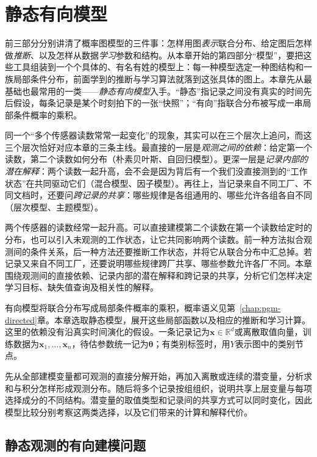 \chapter{静态有向模型}
\label{chap:pgm-static-directed}

前三部分分别讲清了概率图模型的三件事：怎样用图\emph{表示}联合分布、给定图后怎样做\emph{推断}、以及怎样从数据\emph{学习}参数和结构。从本章开始的第四部分“模型”，要把这些工具组装到一个个具体的、有名有姓的模型上：每一种模型选定一种图结构和一族局部条件分布，前面学到的推断与学习算法就落到这张具体的图上。本章先从最基础也最常用的一类——\emph{静态有向模型}入手。“静态”指记录之间没有真实的时间先后假设，每条记录是某个时刻拍下的一张“快照”；“有向”指联合分布被写成一串局部条件概率的乘积。

同一个“多个传感器读数常常一起变化”的现象，其实可以在三个层次上追问，而这三个层次恰好对应本章的三条主线。最直接的一层是\emph{观测之间的依赖}：给定第一个读数，第二个读数如何分布（朴素贝叶斯、自回归模型）。更深一层是\emph{记录内部的潜在解释}：两个读数一起升高，会不会是因为背后有一个我们没直接测到的“工作状态”在共同驱动它们（混合模型、因子模型）。再往上，当记录来自不同工厂、不同文档时，还要问\emph{跨记录的共享}：哪些规律是各组通用的、哪些允许各组各自不同（层次模型、主题模型）。

两个传感器的读数经常一起升高。可以直接建模第二个读数在第一个读数给定时的分布，也可以引入未观测的工作状态，让它共同影响两个读数。前一种方法拟合观测间的条件关系，后一种方法还要推断工作状态，并将它从联合分布中汇总掉。若记录又来自不同工厂，还要说明哪些规律跨厂共享、哪些参数允许各厂不同。本章围绕观测间的直接依赖、记录内部的潜在解释和跨记录的共享，分析它们怎样决定学习目标、缺失值查询及相关性的解释。

有向模型将联合分布写成局部条件概率的乘积，概率语义见第~\ref{chap:pgm-directed}章。本章选取静态模型，展开这些局部函数以及相应的推断和学习计算。这里的依赖没有沿真实时间演化的假设。一条记录记为$\bm x\in\mathbb R^d$或离散取值向量，训练数据为$\bm x_1,\ldots,\bm x_n$，待估参数统一记为$\bm\theta$；有类别标签时，用$Y$表示图中的类别节点。

先从全部建模变量都可观测的直接分解开始，再加入离散或连续的潜变量，分析求和与积分怎样形成观测分布。随后将多个记录按组组织，说明共享上层变量与每项选择成分的不同结构。潜变量的取值类型和记录间的共享方式可以同时变化，因此模型比较分别考察这两类选择，以及它们带来的计算和解释代价。

\section{静态观测的有向建模问题}
\label{sec:pgm-static-directed-common}

